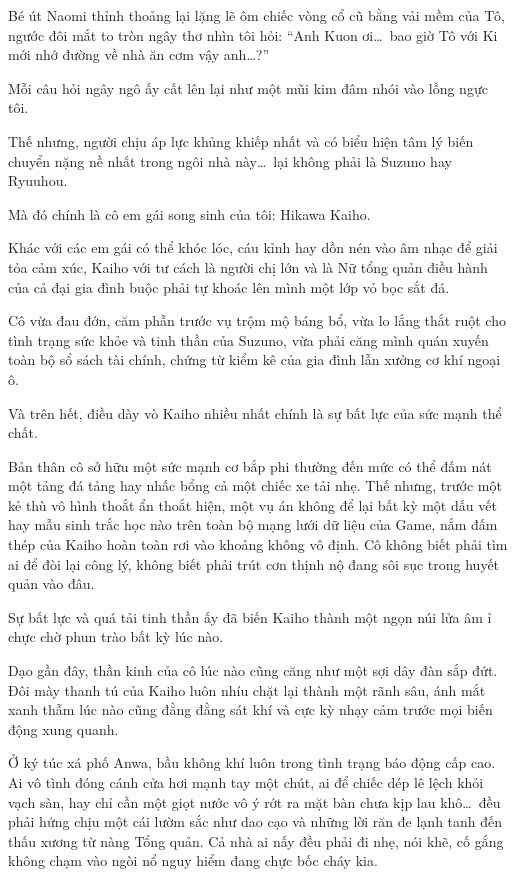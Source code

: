 \documentclass[../main.tex]{subfiles}
\begin{document}
Bé út Naomi thỉnh thoảng lại lặng lẽ ôm chiếc vòng cổ cũ bằng vải mềm của Tô, ngước đôi mắt to tròn ngây thơ nhìn tôi hỏi: ``Anh Kuon ơi\dots\ bao giờ Tô với Ki mới nhớ đường về nhà ăn cơm vậy anh\dots?''

Mỗi câu hỏi ngây ngô ấy cất lên lại như một mũi kim đâm nhói vào lồng ngực tôi.

Thế nhưng, người chịu áp lực khủng khiếp nhất và có biểu hiện tâm lý biến chuyển nặng nề nhất trong ngôi nhà này\dots\ lại không phải là Suzuno hay Ryuuhou.

Mà đó chính là cô em gái song sinh của tôi: Hikawa Kaiho.

Khác với các em gái có thể khóc lóc, cáu kỉnh hay dồn nén vào âm nhạc để giải tỏa cảm xúc, Kaiho với tư cách là người chị lớn và là Nữ tổng quản điều hành của cả đại gia đình buộc phải tự khoác lên mình một lớp vỏ bọc sắt đá.

Cô vừa đau đớn, căm phẫn trước vụ trộm mộ báng bổ, vừa lo lắng thắt ruột cho tình trạng sức khỏe và tinh thần của Suzuno, vừa phải căng mình quán xuyến toàn bộ sổ sách tài chính, chứng từ kiểm kê của gia đình lẫn xưởng cơ khí ngoại ô.

Và trên hết, điều dày vò Kaiho nhiều nhất chính là sự bất lực của sức mạnh thể chất.

Bản thân cô sở hữu một sức mạnh cơ bắp phi thường đến mức có thể đấm nát một tảng đá tảng hay nhấc bổng cả một chiếc xe tải nhẹ. Thế nhưng, trước một kẻ thù vô hình thoắt ẩn thoắt hiện, một vụ án không để lại bất kỳ một dấu vết hay mẫu sinh trắc học nào trên toàn bộ mạng lưới dữ liệu của Game, nắm đấm thép của Kaiho hoàn toàn rơi vào khoảng không vô định. Cô không biết phải tìm ai để đòi lại công lý, không biết phải trút cơn thịnh nộ đang sôi sục trong huyết quản vào đâu.

Sự bất lực và quá tải tinh thần ấy đã biến Kaiho thành một ngọn núi lửa âm ỉ chực chờ phun trào bất kỳ lúc nào.

Dạo gần đây, thần kinh của cô lúc nào cũng căng như một sợi dây đàn sắp đứt. Đôi mày thanh tú của Kaiho luôn nhíu chặt lại thành một rãnh sâu, ánh mắt xanh thẫm lúc nào cũng đằng đằng sát khí và cực kỳ nhạy cảm trước mọi biến động xung quanh.

Ở ký túc xá phố Anwa, bầu không khí luôn trong tình trạng báo động cấp cao. Ai vô tình đóng cánh cửa hơi mạnh tay một chút, ai để chiếc dép lê lệch khỏi vạch sàn, hay chỉ cần một giọt nước vô ý rớt ra mặt bàn chưa kịp lau khô\dots\ đều phải hứng chịu một cái lườm sắc như dao cạo và những lời răn đe lạnh tanh đến thấu xương từ nàng Tổng quản. Cả nhà ai nấy đều phải đi nhẹ, nói khẽ, cố gắng không chạm vào ngòi nổ nguy hiểm đang chực bốc cháy kia.
\end{document}
